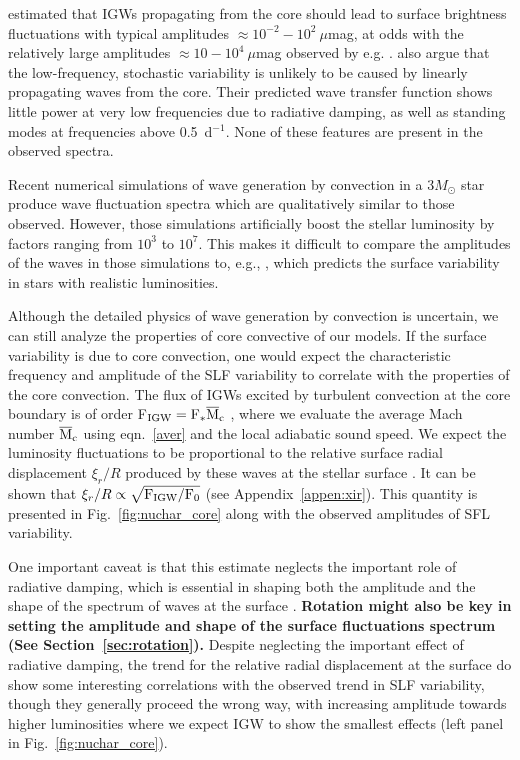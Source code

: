 \documentclass[twocolumn]{aastex63}
\begin{document}
\citet{Shiode:2013} estimated that IGWs propagating from the core should lead to surface brightness fluctuations with typical amplitudes $\approx 10^{-2}-10^{2}~\mu$mag, at odds with the relatively large amplitudes $\approx10-10^4~\mu$mag observed by e.g. \citet{Bowman:2020}.
 \citet{Lecoanet:2020} also argue that the low-frequency, stochastic variability is unlikely to be caused by linearly propagating waves from the core. Their predicted wave transfer function shows little power at very low frequencies due to radiative damping, as well as standing modes at frequencies above 0.5~d$^{-1}$. None of these features are present in the observed spectra.

 Recent numerical simulations of wave generation by convection in a $3M_\odot$ star \citep{Edelmann:2019,Horst:2020} produce wave fluctuation spectra which are qualitatively similar to those observed. However, those simulations artificially boost the stellar luminosity by factors ranging from $10^3$ to $10^7$. This makes it difficult to compare the amplitudes of the waves in those simulations to, e.g., \citet{Shiode:2013}, which predicts the surface variability in stars with realistic luminosities.

Although the detailed physics of wave generation by convection is uncertain, we can still analyze the properties of core convective of our models.
If the surface variability is due to core convection, one would expect the characteristic frequency and amplitude of the SLF variability to correlate with the properties of the core convection.
The flux of IGWs excited by turbulent convection at the core boundary is of order F$_{\rm IGW} = {\rm F}_* \overline{\rm M}_{\rm c}$ \citep{1990ApJ...363..694G},  where we evaluate the average Mach number $\overline{\rm M}_{\rm c}$ using eqn.~\ref{aver} and the local adiabatic sound speed.  We expect the luminosity fluctuations to be proportional to the relative surface radial displacement $\xi_r/R$ produced by these waves at the stellar surface \citep[e.g.][]{Dziembowski:1977,Aerts:2010}.  It can be shown that  $\xi_r/R \propto \sqrt{{\rm F}_{\rm IGW}/ {\rm F}_0} $ (see Appendix~\ref{appen:xir}).  This quantity is presented in Fig.~\ref{fig:nuchar_core} along with the observed amplitudes of SFL variability. 

One important caveat is that this estimate neglects the important role of radiative damping, which is essential in shaping both the amplitude and the shape of the spectrum of waves at the surface \citep[e.g.][]{Lecoanet:2020}. {\bf Rotation might also be key in setting the amplitude and shape of the surface fluctuations spectrum (See Section~\ref{sec:rotation}).}
Despite neglecting the important effect of radiative damping, the trend for the relative radial displacement at the surface do show some interesting correlations with the observed trend in SLF variability, though they generally proceed the wrong way, with increasing amplitude towards higher luminosities where we expect IGW to show the smallest effects (left panel in Fig.~\ref{fig:nuchar_core}).  
\end{document}

